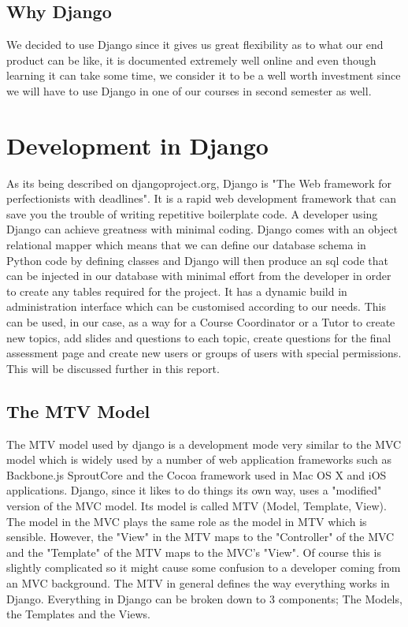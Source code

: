 \documentclass{l3proj}
\begin{document}
\subsection {Why Django}
We decided to use Django since it gives us great flexibility as to what our end product 
can be like, it is documented extremely well online and even though learning it can take 
some time, we consider it to be a well worth investment since we will have to use 
Django in one of our courses in second semester as well. 
\section{Development in Django}
As its being described on djangoproject.org, Django is "The Web framework for 
perfectionists with deadlines". It is a rapid web development framework that can save 
you the trouble of writing repetitive boilerplate code. A developer using Django can 
achieve greatness with minimal coding. Django comes with an object relational mapper 
which means that we can define our database schema in Python code by defining 
classes and Django will then produce an sql code that can be injected in our database 
with minimal effort from the developer in order to create any tables required for the 
project. It has a dynamic build in administration interface which can be customised 
according to our needs. This can be used, in our case, as a way for a Course 
Coordinator or a Tutor to create new topics, add slides and questions to each topic, 
create questions for the final assessment page and create new users or groups of users 
with special permissions. This will be discussed further in this report.
\subsection{The MTV Model}
The MTV model used by django is a development mode very similar to the MVC model which is widely used by a number of web application 
frameworks such as Backbone.js SproutCore and the Cocoa framework used in Mac OS X and iOS applications. Django, since it likes to do things its own way, uses a "modified" version of the MVC model. Its model is called MTV (Model, Template, View). The model in the MVC 
plays the same role as the model in MTV which is sensible. However, the "View" in the 
MTV maps to the "Controller" of the MVC and the "Template" of the MTV maps to the 
MVC's "View". Of course this is slightly complicated so it might cause some confusion to 
a developer coming from an MVC background. 
The MTV in general defines the way everything works in Django. Everything in Django 
can be broken down to 3 components; The Models, the Templates and the Views.
\end{document}
